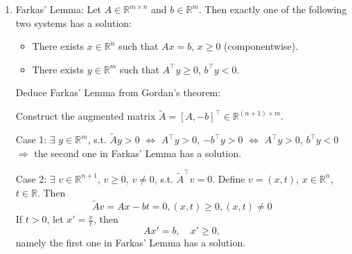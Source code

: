 \documentclass[11pt,letter,notitlepage]{article}
\theoremstyle{definition}
\begin{document}
\begin{solution}
\begin{enumerate}[label=(\arabic*)]
            In conclusion, the first one and the second one are mutually exclusive and collectively exhaustive, i.e., exactly one of the two systems has a solution.
            \item
            Farkas' Lemma:
            Let $A \in \mathbb{R}^{m \times n}$ and $b \in \mathbb{R}^m$. Then exactly one of the following two systems has a solution:
            \begin{itemize}
                \item There exists $x \in \mathbb{R}^n$ such that $Ax = b$, $x \geq 0$ (componentwise).
                \item There exists $y \in \mathbb{R}^m$ such that $A^{\top} y \geq 0$, $b^{\top} y < 0$.
            \end{itemize}
            Deduce Farkas' Lemma from Gordan's theorem:

            Construct the augmented matrix $\tilde{A} = [A, -b]^{\top} \in \mathbb{R}^{(n+1) \times m}$. 

            Case 1: $\exists$ $y \in \mathbb{R}^m$, s.t. $\tilde{A} y > 0$ $\Longleftrightarrow$ $A^{\top} y > 0$, $-b^{\top} y > 0$ $\Longleftrightarrow$ $A^{\top} y > 0$, $b^{\top} y < 0$ $\Longrightarrow$ the second one in Farkas' Lemma has a solution.

            Case 2: $\exists$ $v \in \mathbb{R}^{n+1}$, $v \geq 0$, $v \neq 0$, s.t. $\tilde{A}^{\top} v = 0$. Define $v = (x,t)$, $x \in \mathbb{R}^n$, $t \in \mathbb{R}$. Then
            \[
            \tilde{A} v
            =
            A x - b t
            =
            0
            ,
            (x,t) \geq 0, (x,t) \neq 0
            \]
            If $t > 0$, let $x' = \frac{x}{t}$, then
            \[
            A x' = b, \quad x' \geq 0,
            \]
            namely the first one in Farkas' Lemma has a solution.


\end{enumerate}
\end{solution}
\end{document}
